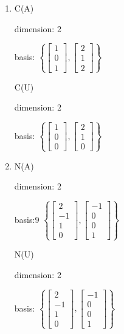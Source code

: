 \documentclass[12pt,letterpaper]{article}
\begin{document}
      \begin{enumerate}
        \item
          C(A)

          dimension: 2

          basis:
          $\left\{\begin{bmatrix}1 \\ 0 \\ 1\end{bmatrix}, \begin{bmatrix}2 \\ 1 \\ 2\end{bmatrix}\right\}$

          C(U)

          dimension: 2

          basis:
          $\left\{\begin{bmatrix}1 \\ 0 \\ 0\end{bmatrix}, \begin{bmatrix}2 \\ 1 \\ 0\end{bmatrix}\right\}$

        \item
          N(A)

          dimension: 2

          basis:9
          $\left\{\begin{bmatrix}2 \\ -1 \\ 1 \\ 0\end{bmatrix}, \begin{bmatrix}-1 \\ 0 \\ 0 \\ 1\end{bmatrix}\right\}$

          N(U)

          dimension: 2

          basis:
          $\left\{\begin{bmatrix}2 \\ -1 \\ 1 \\ 0\end{bmatrix}, \begin{bmatrix}-1 \\ 0 \\ 0 \\ 1\end{bmatrix}\right\}$


\end{enumerate}
\end{document}
